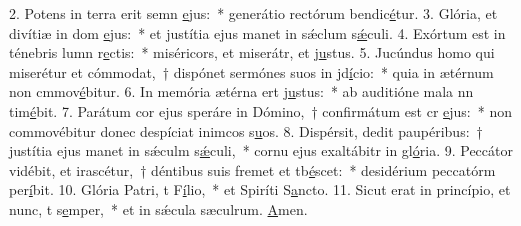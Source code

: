 2. Potens in terra erit semn \uline{e}jus:~* generátio rectórum bendic\uline{é}tur.
3. Glória, et divítiæ in dom \uline{e}jus:~* et justítia ejus manet in sǽclum s\uline{ǽ}culi.
4. Exórtum est in ténebris lumn r\uline{e}ctis:~* miséricors, et miserátr, et j\uline{u}stus.
5. Jucúndus homo qui miserétur et cómmodat,~† dispónet sermónes suos in jd\uline{í}cio:~* quia in ætérnum non cmmov\uline{é}bitur.
6. In memória ætérna ert j\uline{u}stus:~* ab auditióne mala nn tim\uline{é}bit.
7. Parátum cor ejus speráre in Dómino,~† confirmátum est cr \uline{e}jus:~* non commovébitur donec despíciat inimcos s\uline{u}os.
8. Dispérsit, dedit paupéribus:~† justítia ejus manet in sǽculm s\uline{ǽ}culi,~* cornu ejus exaltábitr in gl\uline{ó}ria.
9. Peccátor vidébit, et irascétur,~† déntibus suis fremet et tb\uline{é}scet:~* desidérium peccatórm per\uline{í}bit.
10. Glória Patri, t F\uline{í}lio,~* et Spiríti S\uline{a}ncto.
11. Sicut erat in princípio, et nunc, t s\uline{e}mper,~* et in sǽcula sæculrum. \uline{A}men.
